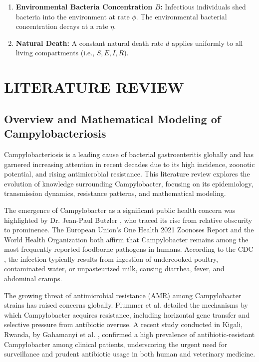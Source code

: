 \documentclass[a4paper,12pt]{report}
\begin{document}
\begin{enumerate}
    \item \textbf{Environmental Bacteria Concentration \( B \):} Infectious individuals shed bacteria into the environment at rate \( \phi \). The environmental bacterial concentration decays at a rate \( \eta \).
    
    \item \textbf{Natural Death:} A constant natural death rate \( d \) applies uniformly to all living compartments (i.e., \( S, E, I, R \)).
\end{enumerate}







\chapter{LITERATURE REVIEW}

\section{Overview and Mathematical Modeling of Campylobacteriosis}

Campylobacteriosis is a leading cause of bacterial gastroenteritis globally and has garnered increasing attention in recent decades due to its high incidence, zoonotic potential, and rising antimicrobial resistance. This literature review explores the evolution of knowledge surrounding Campylobacter, focusing on its epidemiology, transmission dynamics, resistance patterns, and mathematical modeling.





The emergence of Campylobacter as a significant public health concern was highlighted by Dr. Jean-Paul Butzler \cite{DRC}, who traced its rise from relative obscurity to prominence. The European Union’s One Health 2021 Zoonoses Report \cite{EFSA} and the World Health Organization \cite{who} both affirm that Campylobacter remains among the most frequently reported foodborne pathogens in humans. According to the CDC \cite{CDC}, the infection typically results from ingestion of undercooked poultry, contaminated water, or unpasteurized milk, causing diarrhea, fever, and abdominal cramps.



 

The growing threat of antimicrobial resistance (AMR) among Campylobacter strains has raised concerns globally. Plummer et al. \cite{SAHIN} detailed the mechanisms by which Campylobacter acquires resistance, including horizontal gene transfer and selective pressure from antibiotic overuse. A recent study conducted in Kigali, Rwanda, by Gahamanyi et al. \cite{BMC}, confirmed a high prevalence of antibiotic-resistant Campylobacter among clinical patients, underscoring the urgent need for surveillance and prudent antibiotic usage in both human and veterinary medicine.
\end{document}
